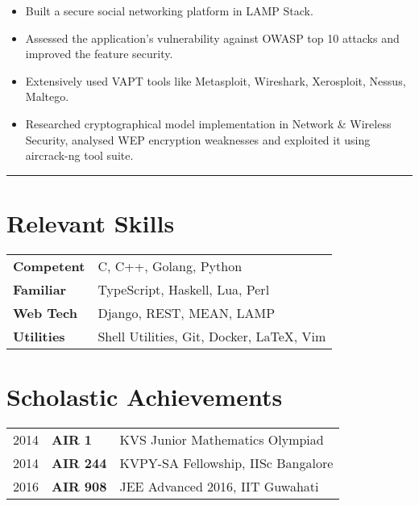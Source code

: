 \documentclass[10pt, margin=0.5in]{deedy-resume-openfont}
\begin{document}
\begin{minipage}[t]{0.48\textwidth}
\vspace{5pt}
\begin{itemize}[leftmargin=*, noitemsep]
  \item Built a secure social networking platform in LAMP Stack.
  \item Assessed the application's vulnerability against OWASP top 10 attacks and improved the feature security.
  \item Extensively used VAPT tools like Metasploit, Wireshark, Xerosploit, Nessus, Maltego.
  \item	Researched cryptographical model implementation in Network \& Wireless Security, analysed WEP encryption weaknesses and exploited it using aircrack-ng tool suite.
\end{itemize}


\vspace{-2pt}				%
\rule{\textwidth}{0.5pt}	%
\vspace{-14pt}				%

%
%
\section{Relevant Skills}
\vspace{0pt}
\begin{tabular}{ll}
 \textbf{Competent}  & C, C++, Golang, Python \\
 \textbf{Familiar}   & TypeScript, Haskell, Lua, Perl \\
 \textbf{Web Tech}   & Django, REST, MEAN, LAMP \\
 \textbf{Utilities}  & Shell Utilities, Git, Docker, \LaTeX, Vim
\end{tabular}


%
%
\section{Scholastic Achievements}
\vspace{0pt}
\begin{tabular}{lll}
  2014	   & \textbf{AIR 1}  & KVS Junior Mathematics Olympiad\\
  2014	   & \textbf{AIR 244}& KVPY-SA Fellowship, IISc Bangalore \\
  2016     & \textbf{AIR 908}& JEE Advanced 2016, IIT Guwahati \\
\end{tabular}


\end{minipage}
\end{document}
